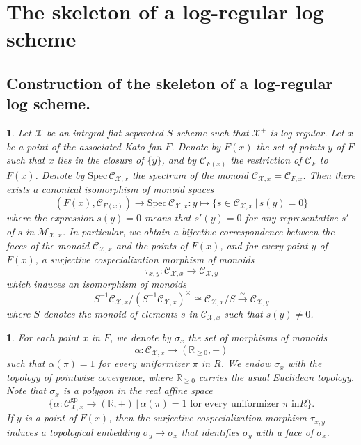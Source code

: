 \documentclass{amsart}%
\numberwithin{equation}{subsection}
\theoremstyle{plain2}
\theoremstyle{definition2}
\theoremstyle{stepstyle}
\theoremstyle{point}
\theoremstyle{subpoint}
\newtheorem{subpoint}[equation]{}%
\newcommand{\spa}[1]{\begin{subpoint}#1\end{subpoint}}           %
\newcommand{\R}{\ensuremath{\mathbb{R}}}
\newcommand{\cX}{\ensuremath{\mathscr{X}}}
\renewcommand{\R}{\ensuremath{\mathbb{R}}}
\newcommand{\Spec}{\ensuremath{\mathrm{Spec}\,}}
\newcommand{\gp}{\mathrm{gp}}
\begin{document}
\section{The skeleton of a log-regular log scheme} \label{sect skeleton log}
\subsection{Construction of the skeleton of a log-regular log scheme.}

\spa{Let $\cX$ be an integral flat separated $S$-scheme such that $\cX^+$ is log-regular. Let $x$ be a point of the associated Kato fan $F$. Denote by $F(x)$ the set of points
$y$ of $F$ such that $x$ lies in the closure of $\{y\}$, and by
$\mathcal{C}_{F(x)}$ the restriction of $\mathcal{C}_F$ to $F(x)$.
Denote
 by $\Spec \mathcal{C}_{\cX,x}$ the spectrum of the monoid
$\mathcal{C}_{\cX,x}=\mathcal{C}_{F,x}$. Then there exists a
canonical isomorphism of
 monoid spaces
$$(F(x),\mathcal{C}_{F(x)})\to \Spec \mathcal{C}_{\cX,x}:y\mapsto \{s\in \mathcal{C}_{\cX,x}\,|\,s(y)= 0\}$$
 where the expression $s(y)= 0$ means that $s'(y)= 0$ for any representative $s'$ of $s$ in $\mathcal{M}_{\cX,x}$.
   In particular, we obtain a bijective correspondence between the
 faces of the monoid $\mathcal{C}_{\cX,x}$ and the points of $F(x)$,
 and for every point $y$ of $F(x)$, a surjective cospecialization morphism of monoids
$$\tau_{x,y}:\mathcal{C}_{\cX,x}\to \mathcal{C}_{\cX,y}$$ which
induces an isomorphism of monoids
 $$S^{-1}\mathcal{C}_{\cX,x}/(S^{-1}\mathcal{C}_{\cX,x})^{\times}\cong \mathcal{C}_{\cX,x}/S \xrightarrow{\sim}
 \mathcal{C}_{\cX,y}$$ where $S$ denotes the monoid of elements $s$
 in $\mathcal{C}_{\cX,x}$ such that $s(y)\neq 0$.}
\spa{For each point $x$ in $F$, we denote by $\sigma_x$ the set
of morphisms of monoids
 $$\alpha:\mathcal{C}_{\cX,x}\to (\R_{\geq 0},+)$$ such that
 $\alpha(\pi)=1$ for every uniformizer $\pi$ in $R$.
 We endow $\sigma_x$ with the topology of
 pointwise covergence, where $\R_{\geq 0}$ carries the usual Euclidean
 topology. Note that $\sigma_x$ is a polygon in the real affine
 space
$$\{\alpha:\mathcal{C}^{\gp}_{\cX,x}\to (\R,+)\,|\,\alpha(\pi)=1\mbox{ for every uniformizer }\pi\mbox{ in
}R\}.$$ If $y$ is a point of $F(x)$, then the surjective
cospecialization morphism $\tau_{x,y}$ induces a topological
embedding $\sigma_y\to \sigma_x$ that identifies $\sigma_y$ with a
face of $\sigma_x$.}
\end{document}
